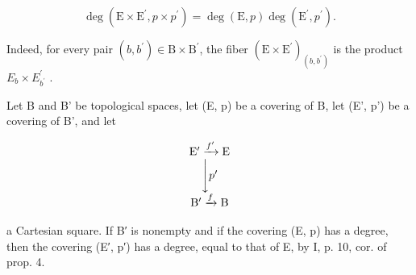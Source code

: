 \[
\deg (\mathrm{E} \times \mathrm{E} ^ {\prime}, p \times p ^ {\prime}) = \deg (\mathrm{E}, p) \deg (\mathrm{E} ^ {\prime}, p ^ {\prime}).
\]

Indeed, for every pair \((b,b^{\prime})\in\mathrm{B}\times\mathrm{B}^{\prime}\), the fiber \((\mathrm{E}\times\mathrm{E}^{\prime})_{(b,b^{\prime})}\) is the product \(E_{b}\times E_{b^{\prime}}^{\prime}\) .

Let B and B' be topological spaces, let (E, p) be a covering of B, let (E', p') be a covering of B', and let

\[
\begin{array}{c} \mathrm{E} ^ {\prime} \xrightarrow {f ^ {\prime}} \mathrm{E} \\ \Biggl \downarrow p ^ {\prime} \\ \mathrm{B} ^ {\prime} \xrightarrow {f} \mathrm{B} \end{array}
\]

a Cartesian square. If B′ is nonempty and if the covering (E, p) has a degree, then the covering (E′, p′) has a degree, equal to that of E, by I, p. 10, cor. of prop. 4.

